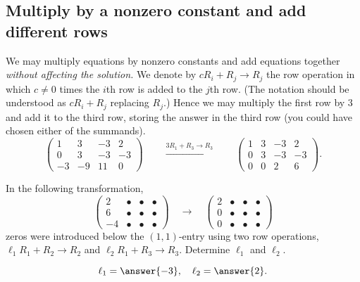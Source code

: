 \documentclass{ximera}
\begin{document}
\subsection{Multiply by a nonzero constant and add different rows}
We may multiply equations by nonzero constants and add equations
together \emph{without affecting the solution.} We denote by
$c R_i + R_j \to R_j$ the row operation in which $c \neq 0$ times the
$i$th row is added to the $j$th row. (The notation should be
understood as $c R_i + R_j$ replacing $R_j$.) Hence we may multiply
the first row by $3$ and add it to the third row, storing the answer
in the third row (you could have chosen either of the summands).
\[
  \left(
    \begin{array}{ccc|c}
      1 &   3 & -3 & 2  \\
      0 &   3 & -3 & -3 \\
      -3& -9  & 11 & 0
    \end{array}
  \right)
  \qquad\xrightarrow{3R_1+R_3\rightarrow R_3}\qquad
  \left(
    \begin{array}{ccc|c}
      1 &   3 & -3 & 2  \\
      0 &   3 & -3 & -3 \\
      0& 0  & 2 & 6
    \end{array}
  \right).
\]

\begin{question}
  In the following transformation,
  \[
    \begin{pmatrix}
      2 & \bullet & \bullet & \bullet \\
      6 & \bullet & \bullet & \bullet \\
      -4 & \bullet & \bullet & \bullet
    \end{pmatrix}
    \quad\longrightarrow\quad
    \begin{pmatrix}
      2 & \bullet & \bullet & \bullet \\
      0 & \bullet & \bullet & \bullet \\
      0 & \bullet & \bullet & \bullet
    \end{pmatrix}
  \]
  zeros were introduced below the $(1,1)$-entry using two row
  operations, $\ell_1 R_1 + R_2 \to R_2$ and
  $\ell_2 R_1 + R_3 \to R_3$. Determine $\ell_1$ and $\ell_2$.
  \begin{prompt}
    \[
      \ell_1 = \answer{-3}, \quad \ell_2 = \answer{2}.
    \]
  \end{prompt}
\end{question}
\end{document}
